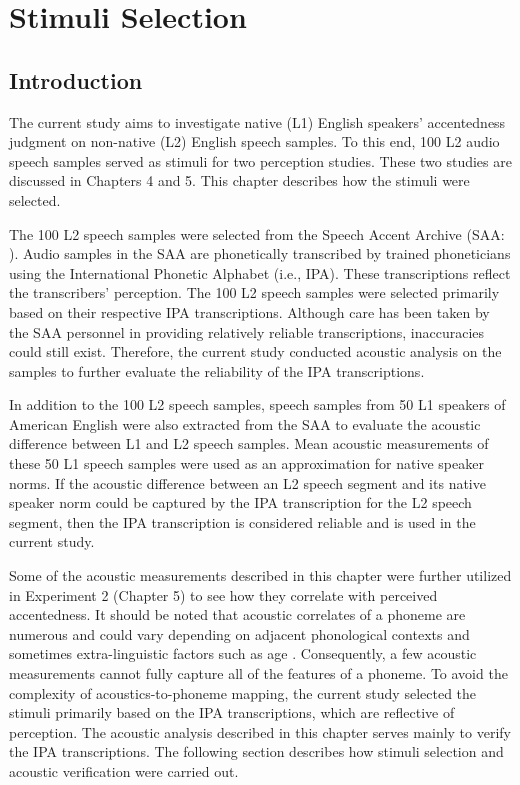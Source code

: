 \chapter{Stimuli Selection}
\label{ch:3}

\section{Introduction}

The current study aims to investigate native (L1) English speakers’ accentedness judgment on non-native (L2) English speech samples. To this end, 100 L2 audio speech samples served as stimuli for two perception studies. These two studies are discussed in Chapters 4 and 5. This chapter describes how the stimuli were selected. 

The 100 L2 speech samples were selected from the Speech Accent Archive (SAA: \citealp{Weinberger_saa_2019}). Audio samples in the SAA are phonetically transcribed by trained phoneticians using the International Phonetic Alphabet (i.e., IPA). These transcriptions reflect the transcribers’ perception. The 100 L2 speech samples were selected primarily based on their respective IPA transcriptions. Although care has been taken by the SAA personnel in providing relatively reliable transcriptions, inaccuracies could still exist. Therefore, the current study conducted acoustic analysis on the samples to further evaluate the reliability of the IPA transcriptions. 

In addition to the 100 L2 speech samples, speech samples from 50 L1 speakers of American English were also extracted from the SAA to evaluate the acoustic difference between L1 and L2 speech samples. Mean acoustic measurements of these 50 L1 speech samples were used as an approximation for native speaker norms. If the acoustic difference between an L2 speech segment and its native speaker norm could be captured by the IPA transcription for the L2 speech segment, then the IPA transcription is considered reliable and is used in the current study. 

Some of the acoustic measurements described in this chapter were further utilized in Experiment 2 (Chapter 5) to see how they correlate with perceived accentedness.  It should be noted that acoustic correlates of a phoneme are numerous and could vary depending on adjacent phonological contexts and sometimes extra-linguistic factors such as age \citep{Holt_2010}. Consequently, a few acoustic measurements cannot fully capture all of the features of a phoneme. To avoid the complexity of acoustics-to-phoneme mapping, the current study selected the stimuli primarily based on the IPA transcriptions, which are reflective of perception. The acoustic analysis described in this chapter serves mainly to verify the IPA transcriptions. The following section describes how stimuli selection and acoustic verification were carried out. 

